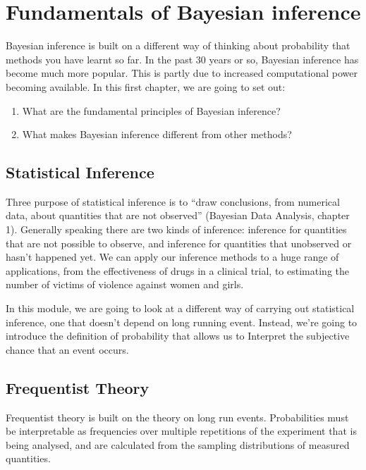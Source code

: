 \documentclass[
]{book}
\theoremstyle{definition}
\theoremstyle{definition}
\theoremstyle{definition}
\theoremstyle{definition}
\theoremstyle{remark}
\begin{document}
\hypertarget{fundamentals}{%
\chapter{Fundamentals of Bayesian inference}\label{fundamentals}}

Bayesian inference is built on a different way of thinking about probability that methods you have learnt so far. In the past 30 years or so, Bayesian inference has become much more popular. This is partly due to increased computational power becoming available. In this first chapter, we are going to set out:

\begin{enumerate}
\def\labelenumi{\arabic{enumi}.}
\item
  What are the fundamental principles of Bayesian inference?
\item
  What makes Bayesian inference different from other methods?
\end{enumerate}

\hypertarget{statistical-inference}{%
\section{Statistical Inference}\label{statistical-inference}}

Three purpose of statistical inference is to ``draw conclusions, from numerical data, about quantities that are not observed'' (Bayesian Data Analysis, chapter 1). Generally speaking there are two kinds of inference: inference for quantities that are not possible to observe, and inference for quantities that unobserved or hasn't happened yet. We can apply our inference methods to a huge range of applications, from the effectiveness of drugs in a clinical trial, to estimating the number of victims of violence against women and girls.

In this module, we are going to look at a different way of carrying out statistical inference, one that doesn't depend on long running event. Instead, we're going to introduce the definition of probability that allows us to Interpret the subjective chance that an event occurs.

\hypertarget{frequentist-theory}{%
\section{Frequentist Theory}\label{frequentist-theory}}

Frequentist theory is built on the theory on long run events. Probabilities must be interpretable as frequencies over multiple repetitions of the experiment that is being analysed, and are calculated from the sampling distributions of measured quantities.
\end{document}
